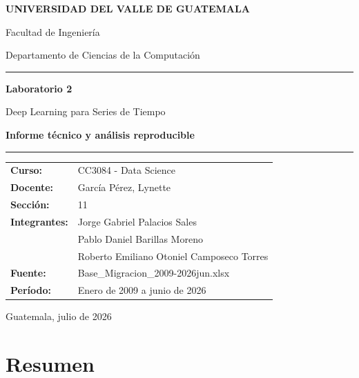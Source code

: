 \documentclass[11pt,letterpaper]{article}
\begin{document}
\hypersetup{pageanchor=false}
\begin{titlepage}
\pagecolor{Navy}
\color{white}
\vspace*{1.0cm}

{\Large\bfseries UNIVERSIDAD DEL VALLE DE GUATEMALA\par}
\vspace{0.3cm}
{\large Facultad de Ingeniería\par}
{\large Departamento de Ciencias de la Computación\par}

\vfill

{\color{Teal}\rule{\textwidth}{2.5pt}}\par
\vspace{0.7cm}
{\Huge\bfseries Laboratorio 2\par}
\vspace{0.25cm}
{\LARGE Deep Learning para Series de Tiempo\par}
\vspace{0.5cm}
{\Large\bfseries Informe técnico y análisis reproducible\par}
\vspace{0.7cm}
{\color{Teal}\rule{\textwidth}{2.5pt}}\par

\vfill

\begin{tabular}{@{}>{\bfseries}p{4.0cm}p{10.5cm}@{}}
Curso: & CC3084 - Data Science\\[4pt]
Docente: & García Pérez, Lynette\\[4pt]
Sección: & 11\\[4pt]
Integrantes: &
Jorge Gabriel Palacios Sales\\
& Pablo Daniel Barillas Moreno\\
& Roberto Emiliano Otoniel Camposeco Torres\\[4pt]
Fuente: & Base\_Migracion\_2009-2026jun.xlsx\\[4pt]
Período: & Enero de 2009 a junio de 2026\\
\end{tabular}

\vfill
{\large Guatemala, julio de 2026\par}
\end{titlepage}
\nopagecolor
\color{Ink}
\hypersetup{pageanchor=true}

\tableofcontents
\newpage
\listoffigures
\listoftables
\newpage
{}

\section{Resumen}
\end{document}
